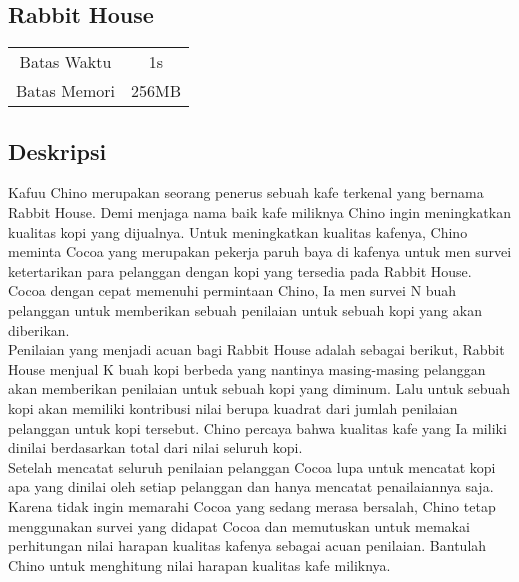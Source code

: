 \documentclass{article}
\begin{document}
\begin{center}

    
    \section*{Rabbit House} %

    \begin{tabular}{ | c c | }
        \hline
        Batas Waktu  & 1s \\    %
        Batas Memori & 256MB \\  %
        \hline
    \end{tabular}
\end{center}

\subsection*{Deskripsi}

Kafuu Chino merupakan seorang penerus sebuah kafe terkenal yang bernama Rabbit House. Demi menjaga nama baik kafe miliknya Chino ingin meningkatkan kualitas kopi yang dijualnya. Untuk meningkatkan kualitas kafenya, Chino meminta Cocoa yang merupakan pekerja paruh baya di kafenya untuk men survei ketertarikan para pelanggan dengan kopi yang tersedia pada Rabbit House. Cocoa dengan cepat memenuhi permintaan Chino, Ia men survei N buah pelanggan untuk memberikan sebuah penilaian untuk sebuah kopi yang akan diberikan.\\

Penilaian yang menjadi acuan bagi Rabbit House adalah sebagai berikut, Rabbit House menjual K buah kopi berbeda yang nantinya masing-masing pelanggan akan memberikan penilaian untuk sebuah kopi yang diminum. Lalu untuk sebuah kopi akan memiliki kontribusi nilai berupa kuadrat dari jumlah penilaian pelanggan untuk kopi tersebut. Chino percaya bahwa kualitas kafe yang Ia miliki dinilai berdasarkan total dari nilai seluruh kopi.\\

Setelah mencatat seluruh penilaian pelanggan Cocoa lupa untuk mencatat kopi apa yang dinilai oleh setiap pelanggan dan hanya mencatat penailaiannya saja. Karena tidak ingin memarahi Cocoa yang sedang merasa bersalah, Chino tetap menggunakan survei yang didapat Cocoa dan memutuskan untuk memakai perhitungan nilai harapan kualitas kafenya sebagai acuan penilaian. Bantulah Chino untuk menghitung nilai harapan kualitas kafe miliknya.\\
\end{document}
